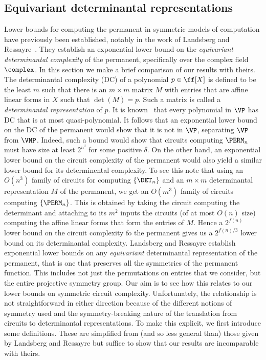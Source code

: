 \documentclass[11pt]{article}
\begin{document}
\subsection{Equivariant determinantal representations}\label{sec:equivariant}
Lower bounds for computing the permanent in symmetric models of computation have previously been established, notably in the work of Landsberg and Ressayre~\cite{LandsbergR16}.  They establish an exponential lower bound on the \emph{equivariant determinantal complexity} of the permanent, specifically over the complex field $\complex$.  In this section we make a brief comparison of our results with theirs.
The determinantal complexity (DC) of a polynomial $p \in \ff[X]$ is defined to be the least $m$ such that there is an $m\times m$ matrix $M$ with entries that are affine linear forms in $X$ such that $\det(M) = p$.  Such a matrix is called a \emph{determinantal representation} of $p$.  It is known~\cite{Valiant79} that every polynomial in $\VP$ has DC that is at most quasi-polynomial.  It follows that an exponential lower bound on the DC of the permanent would show that it is not in $\VP$, separating $\VP$ from $\VNP$.  Indeed, such a bound would 
show that circuits computing $\PERM_n$ must have size at least $2^{n^{\delta}}$ for some positive $\delta$.  On the other hand, an exponential lower bound on the circuit complexity of the permanent would also yield a similar lower bound for its determinental complexity.  To see this note that using an $O(n^3)$ family of circuits for computing $\{\DET_n\}$ and an $m\times m$ determinantal representation $M$ of the permanent, we get an $O(m^3)$ family of circuits computing $\{\PERM_n\}$.  This is obtained by taking the circuit computing the determinant and attaching to its $m^2$ inputs the circuits (of at most $O(n)$ size) computing the affine linear forms that form the entries of $M$.  Hence a $2^{f(n)}$ lower bound on the circuit complexity fo the permanent gives us a $2^{f(n)/3}$ lower bound on its determinantal complexity.
Landsberg and Ressayre establish exponential lower bounds on any \emph{equivariant} determinantal representation of the permanent, that is one that preserves all the symmetries of the permanent function.  This includes not just the
permutations on entries that we consider, but the entire projective symmetry
group.  Our aim is to see how this relates to our lower bounds on symmetric circuit complexity.  Unfortunately, the relationship is not straightforward in either direction because of the different notions of symmetry used and the symmetry-breaking nature of the translation from circuits to determinantal representations.  To make this explicit, we first introduce some definitions.  These are simplified from (and so less general than) those given by Landsberg and Ressayre but suffice to show that our results are incomparable with theirs. 
\end{document}
